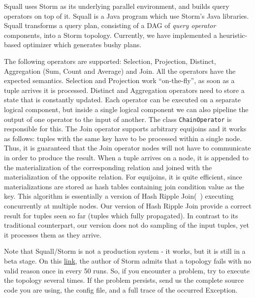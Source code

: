 \documentclass[a4paper,10pt]{article}
\begin{document}
Squall uses Storm as its underlying parallel environment, and builds query operators on top of it. Squall is a Java program which use Storm's Java libraries. Squall transforms a query plan, consisting of a DAG of \emph{query operator} components, into a Storm topology. Currently, we have implemented a heuristic-based optimizer which generates bushy plans.

The following operators are supported: Selection, Projection, Distinct, Aggregation (Sum, Count and Average) and Join. All the operators have the expected semantics. Selection and Projection work ``on-the-fly'', as soon as a tuple arrives it is processed. Distinct and Aggregation operators need to store a state that is constantly updated. Each operator can be executed on a separate logical component, but inside a single logical component we can also pipeline the output of one operator to the input of another. The class \verb#ChainOperator# is responsible for this. The Join operator supports arbitrary equijoins and it works as follows: tuples with the same key have to be processed within a single node. Thus, it is guaranteed that the Join operator nodes will not have to communicate in order to produce the result. When a tuple arrives on a node, it is appended to the materialization of the corresponding relation and joined with the materialization of the opposite relation. For equijoins, it is quite efficient, since materializations are stored as hash tables containing join condition value as the key. This algorithm is essentially a version of Hash Ripple Join(~\cite{RippleJoin}) executing concurrently at multiple nodes. Our version of Hash Ripple Join provide a correct result for tuples seen so far (tuples which fully propagated). In contrast to its traditional counterpart, our version does not do sampling of the input tuples, yet it processes them as they arrive.

Note that Squall/Storm is not a production system - it works, but it is still in a beta stage. On this \href{http://groups.google.com/group/storm-user/browse_thread/thread/d4a50cf051ea878d/3c42dd8614aaf549?#3c42dd8614aaf549}{link}, the author of Storm admits that a topology fails with no valid reason once in every 50 runs. So, if you encounter a problem, try to execute the topology several times. If the problem persists, send us the complete source code you are using, the config file, and a full trace of the occurred Exception.

\end{document}
